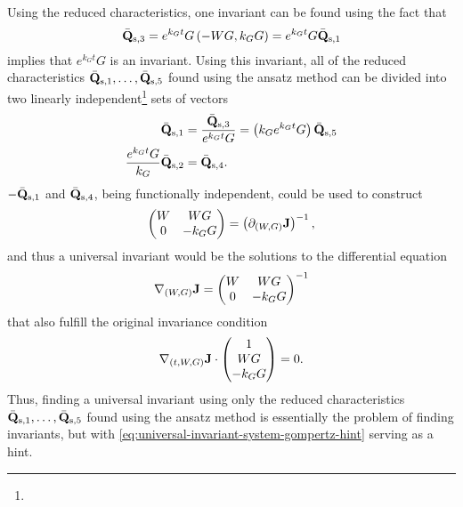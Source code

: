 Using the reduced characteristics, one invariant can be found using the fact that
\begin{equation}
  \bar{\vb{Q}}_{\text{s},3} = e^{k_{G} t} G \left(-W G, k_G G\right) = e^{k_{G} t} G \bar{\vb{Q}}_{\text{s},1}
\end{equation}
implies that \(e^{k_{G} t} G\) is an invariant.
Using this invariant, all of the reduced characteristics \(\bar{\vb{Q}}_{\text{s},1}, \dots, \bar{\vb{Q}}_{\text{s},5}\) found using the ansatz method can be divided into two linearly independent\footnote{} sets of vectors %
\begin{align}
  \bar{\vb{Q}}_{\text{s},1} &= \frac{\bar{\vb{Q}}_{\text{s},3}}{e^{k_{G} t} G} = \left(k_G e^{k_{G} t} G\right) \bar{\vb{Q}}_{\text{s},5} \\
  \frac{e^{k_{G} t} G}{k_G} \bar{\vb{Q}}_{\text{s},2} &= \bar{\vb{Q}}_{\text{s},4}.
\end{align}
\(-\bar{\vb{Q}}_{\text{s},1}\) and \(\bar{\vb{Q}}_{\text{s},4}\), being functionally independent, could be used to construct
\begin{equation}
  \begin{pmatrix}
    W & W G \\
    0 & -k_G G
  \end{pmatrix}
  = \left(\partial_{(W, G)} \vb{J}\right)^{-1},
\end{equation}
and thus a universal invariant would be the solutions to the differential equation
\begin{equation} \label{eq:universal-invariant-system-gompertz-hint}
  \nabla_{(W, G)} \vb{J} =
  \begin{pmatrix}
    W & W G \\
    0 & -k_G G
  \end{pmatrix}^{-1}
\end{equation}
that also fulfill the original invariance condition
\begin{equation}
  \nabla_{(t, W, G)} \vb{J} \cdot
  \begin{pmatrix}
    1 \\
    W G \\
    -k_G G
  \end{pmatrix}
  = 0.
\end{equation}
Thus, finding a universal invariant using only the reduced characteristics \(\bar{\vb{Q}}_{\text{s},1}, \dots, \bar{\vb{Q}}_{\text{s},5}\) found using the ansatz method is essentially the problem of finding invariants, but with \cref{eq:universal-invariant-system-gompertz-hint} serving as a hint.
